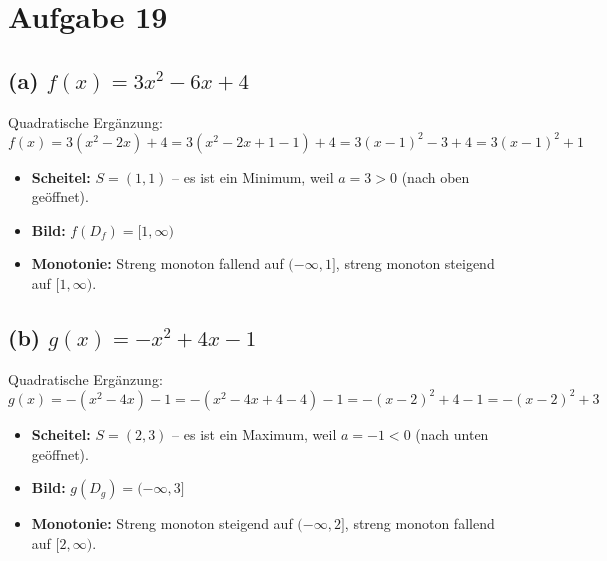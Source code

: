 \documentclass[12pt]{article}
\begin{document}
\section*{Aufgabe 19}

\subsection*{(a) $f(x) = 3x^2 - 6x + 4$}

Quadratische Erg\"anzung:
\[
  f(x) = 3(x^2 - 2x) + 4 = 3(x^2 - 2x + 1 - 1) + 4 = 3(x-1)^2 - 3 + 4 = 3(x-1)^2 + 1
\]

\begin{itemize}
  \item \textbf{Scheitel:} $S = (1, 1)$ -- es ist ein Minimum, weil $a = 3 > 0$ (nach oben ge\"offnet).
  \item \textbf{Bild:} $f(D_f) = [1, \infty)$
  \item \textbf{Monotonie:} Streng monoton fallend auf $(-\infty, 1]$, streng monoton steigend auf $[1, \infty)$.
\end{itemize}

\begin{center}
\end{center}


\subsection*{(b) $g(x) = -x^2 + 4x - 1$}

Quadratische Erg\"anzung:
\[
  g(x) = -(x^2 - 4x) - 1 = -(x^2 - 4x + 4 - 4) - 1 = -(x-2)^2 + 4 - 1 = -(x-2)^2 + 3
\]

\begin{itemize}
  \item \textbf{Scheitel:} $S = (2, 3)$ -- es ist ein Maximum, weil $a = -1 < 0$ (nach unten ge\"offnet).
  \item \textbf{Bild:} $g(D_g) = (-\infty, 3]$
  \item \textbf{Monotonie:} Streng monoton steigend auf $(-\infty, 2]$, streng monoton fallend auf $[2, \infty)$.
\end{itemize}
\end{document}
